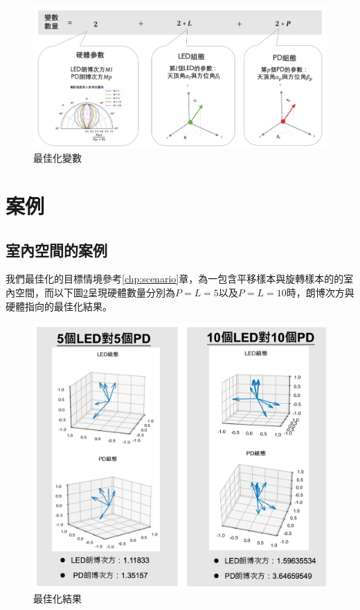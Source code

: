     \begin{figure}[h!]
        \centering
        \includegraphics[width=15cm]{ch5pic/optimize_variable.png}
        \caption{最佳化變數}
        \label{pic:optimize_variable}
    \end{figure}



\section{案例}
\label{chp:optimize_case}

    \subsection{室內空間的案例}

    我們最佳化的目標情境參考\ref{chp:scenario}章，為一包含平移樣本與旋轉樣本的的室內空間，而以下圖\ref{pic:opt_result}呈現硬體數量分別為$P=L=5$以及$P=L=10$時，朗博次方與硬體指向的最佳化結果。

    \begin{figure}[h!]
        \centering
        \includegraphics[width=15cm]{ch5pic/opt_result.png}
        \caption{最佳化結果}
        \label{pic:opt_result}
    \end{figure}

